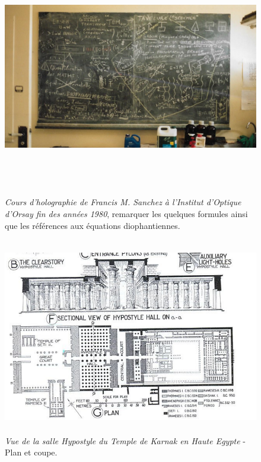 \documentclass[a4paper,12pt]{article}
\begin{document}
\begin{appendix}
\begin{figure}[h]
\centering
\includegraphics[width=14.5cm,height=10.5cm]{./figures/fs-tab.png}
\caption[Cours d'holographie à l'Institut d'Optique d'Orsay]{\textit{Cours d'holographie de Francis M. Sanchez à l'Institut d'Optique d'Orsay fin des années 1980}, remarquer les quelques formules ainsi que les références aux équations diophantiennes.} 
\label{fig:3:figure3}
\end{figure}

\begin{figure}
\centering
\includegraphics[width=14.5cm,height=8.6cm]{./figures/karnak.png}
\caption[Plan du Temple de Karnak]{\textit{Vue de la salle Hypostyle du Temple de Karnak en Haute Egypte} - Plan et coupe.} 
\label{fig:4:figure4}
\end{figure}


\end{appendix}
\end{document}
